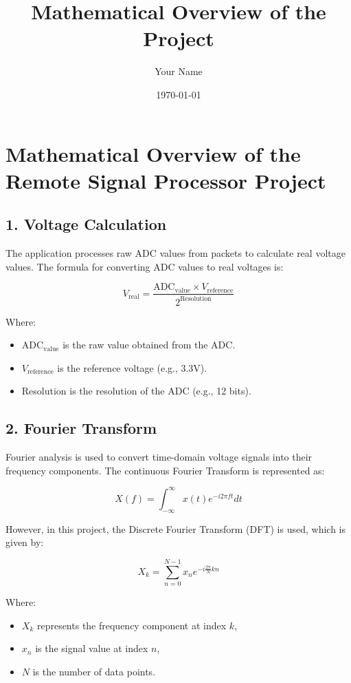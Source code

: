 \documentclass{article}
\begin{document}
\title{Mathematical Overview of the Project}
\author{Your Name}
\date{\today}
\maketitle

\section{Mathematical Overview of the Remote Signal Processor Project}

\subsection{1. Voltage Calculation}

The application processes raw ADC values from packets to calculate real voltage values. The formula for converting ADC values to real voltages is:

\[
V_{\text{real}} = \frac{\text{ADC}_{\text{value}} \times V_{\text{reference}}}{2^{\text{Resolution}}}
\]

Where:
\begin{itemize}
    \item $\text{ADC}_{\text{value}}$ is the raw value obtained from the ADC.
    \item $V_{\text{reference}}$ is the reference voltage (e.g., 3.3V).
    \item Resolution is the resolution of the ADC (e.g., 12 bits).
\end{itemize}

\subsection{2. Fourier Transform}

Fourier analysis is used to convert time-domain voltage signals into their frequency components. The continuous Fourier Transform is represented as:

\[
X(f) = \int_{-\infty}^{\infty} x(t) e^{-i 2 \pi f t} dt
\]

However, in this project, the Discrete Fourier Transform (DFT) is used, which is given by:

\[
X_k = \sum_{n=0}^{N-1} x_n e^{-i \frac{2 \pi}{N} k n}
\]

Where:
\begin{itemize}
    \item $X_k$ represents the frequency component at index $k$,
    \item $x_n$ is the signal value at index $n$,
    \item $N$ is the number of data points.
\end{itemize}
\end{document}
